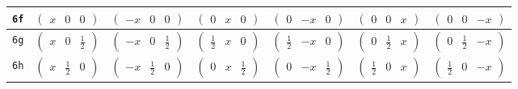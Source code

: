 \documentclass[fleqn,9pt,landscape]{jsarticle}
\begin{document}
\begin{center}
\begin{longtable}{ccccccc}
{\tt 6f} & $ \begin{pmatrix} x & 0 & 0 \end{pmatrix} $ & $ \begin{pmatrix} - x & 0 & 0 \end{pmatrix} $ & $ \begin{pmatrix} 0 & x & 0 \end{pmatrix} $ & $ \begin{pmatrix} 0 & - x & 0 \end{pmatrix} $ & $ \begin{pmatrix} 0 & 0 & x \end{pmatrix} $ & $ \begin{pmatrix} 0 & 0 & - x \end{pmatrix} $ \\ \hline
{\tt 6g} & $ \begin{pmatrix} x & 0 & \frac{1}{2} \end{pmatrix} $ & $ \begin{pmatrix} - x & 0 & \frac{1}{2} \end{pmatrix} $ & $ \begin{pmatrix} \frac{1}{2} & x & 0 \end{pmatrix} $ & $ \begin{pmatrix} \frac{1}{2} & - x & 0 \end{pmatrix} $ & $ \begin{pmatrix} 0 & \frac{1}{2} & x \end{pmatrix} $ & $ \begin{pmatrix} 0 & \frac{1}{2} & - x \end{pmatrix} $ \\ \hline
{\tt 6h} & $ \begin{pmatrix} x & \frac{1}{2} & 0 \end{pmatrix} $ & $ \begin{pmatrix} - x & \frac{1}{2} & 0 \end{pmatrix} $ & $ \begin{pmatrix} 0 & x & \frac{1}{2} \end{pmatrix} $ & $ \begin{pmatrix} 0 & - x & \frac{1}{2} \end{pmatrix} $ & $ \begin{pmatrix} \frac{1}{2} & 0 & x \end{pmatrix} $ & $ \begin{pmatrix} \frac{1}{2} & 0 & - x \end{pmatrix} $ \\ \hline

\end{longtable}
\end{center}
\end{document}
